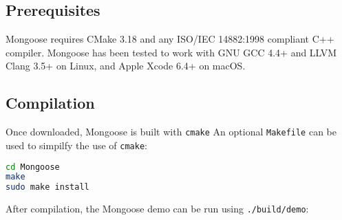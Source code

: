 \documentclass[letter]{article}
\begin{document}
\subsection{Prerequisites}
Mongoose requires CMake 3.18 and any ISO/IEC 14882:1998 compliant C++ compiler. Mongoose has been tested to work with GNU GCC 4.4+ and LLVM Clang 3.5+ on Linux, and Apple Xcode 6.4+ on macOS.

\subsection{Compilation}
Once downloaded, Mongoose is built with \verb'cmake'
An optional \verb'Makefile' can be used to simpilfy the use of
\verb'cmake':

\begin{lstlisting}[language=bash,numbers=none,xleftmargin=.2\textwidth, xrightmargin=.2\textwidth]
cd Mongoose
make
sudo make install
\end{lstlisting}


After compilation, the Mongoose demo can be run using \texttt{./build/demo}:\\
\end{document}
